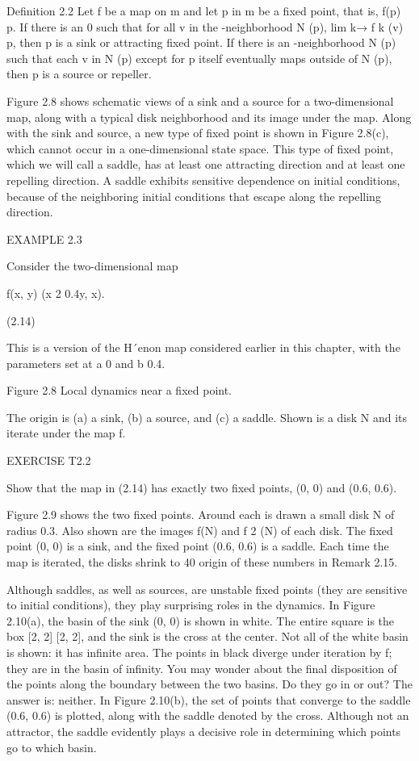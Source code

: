 \documentclass[12pt]{article}
\begin{document}
Deﬁnition 2.2 Let f be a map on  m and let p in  m be a ﬁxed point, that is, f(p)  p. If there is an   0 such that for all v in the  
-neighborhood N  (p), lim k→ f k (v)  p, then p is a sink or attracting ﬁxed point. If there is an  -neighborhood N  (p) such that 
each v in N  (p) except for p itself eventually maps outside of N  (p), then p is a source or repeller.

Figure 2.8 shows schematic views of a sink and a source for a two-dimensional map, along with a typical disk neighborhood and its 
image under the map. Along with the sink and source, a new type of ﬁxed point is shown in Figure 2.8(c), which cannot occur in a 
one-dimensional state space. This type of ﬁxed point, which we will call a saddle, has at least one attracting direction and at 
least one repelling direction. A saddle exhibits sensitive dependence on initial conditions, because of the neighboring initial 
conditions that escape along the repelling direction.

EXAMPLE 2.3

Consider the two-dimensional map

f(x, y)  (x 2  0.4y, x).

(2.14)

This is a version of the H´enon map considered earlier in this chapter, with the parameters set at a  0 and b  0.4.


Figure 2.8 Local dynamics near a ﬁxed point.

The origin is (a) a sink, (b) a source, and (c) a saddle. Shown is a disk N and its iterate under the map f.

EXERCISE T2.2

Show that the map in (2.14) has exactly two ﬁxed points, (0, 0) and (0.6, 0.6).

Figure 2.9 shows the two ﬁxed points. Around each is drawn a small disk N of radius 0.3. Also shown are the images f(N) and f 2 (N) 
of each disk. The ﬁxed point (0, 0) is a sink, and the ﬁxed point (0.6, 0.6) is a saddle. Each time the map is iterated, the disks 
shrink to 40%
origin of these numbers in Remark 2.15.

Although saddles, as well as sources, are unstable ﬁxed points (they are sensitive to initial conditions), they play surprising 
roles in the dynamics. In Figure 2.10(a), the basin of the sink (0, 0) is shown in white. The entire square is the box [2, 2] [2, 2], 
and the sink is the cross at the center. Not all of the white basin is shown: it has inﬁnite area. The points in black diverge under 
iteration by f; they are in the basin of inﬁnity. You may wonder about the ﬁnal disposition of the points along the boundary 
between the two basins. Do they go in or out? The answer is: neither. In Figure 2.10(b), the set of points that converge to the 
saddle (0.6, 0.6) is plotted, along with the saddle denoted by the cross. Although not an attractor, the saddle evidently plays a 
decisive role in determining which points go to which basin.
\end{document}
